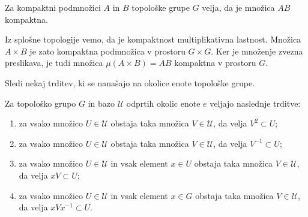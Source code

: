 \documentclass[mat1]{fmfdelo}
\newcommand{\Ucurl}{\mathcal{U}}
\begin{document}
\begin{trditev}\label{trd:prodkomp}
Za kompaktni podmnožici $A$ in $B$ topološke grupe $G$ velja, da je množica $AB$ kompaktna.
\end{trditev}

\begin{dokaz}
Iz splošne topologije vemo, da je kompaktnost multiplikativna lastnost. Množica $A \times B$ je zato kompaktna podmnožica v prostoru $G \times G$. Ker je množenje zvezna preslikava, je tudi množica $\mu (A \times B) = AB$ kompaktna v prostoru $G$.
\end{dokaz}

Sledi nekaj trditev, ki se nanašajo na okolice enote topološke grupe.

\begin{trditev}\label{trd:okolice}
Za topološko grupo $G$ in bazo $\Ucurl$ odprtih okolic enote $e$ veljajo naslednje trditve:
\begin{enumerate}
\item za vsako množico $U \in \Ucurl$ obstaja taka množica $V \in \Ucurl$, da velja $V^{2} \subset U$;\label{last:oko1}
\item za vsako množico $U \in \Ucurl$ obstaja taka množica $V \in \Ucurl$, da velja $V^{-1} \subset U$;\label{last:oko2}
\item za vsako množico $U \in \Ucurl$ in vsak element $x \in U$ obstaja taka množica $V \in \Ucurl$, da velja $xV \subset U$; \label{last:oko3}
\item za vsako množico $U \in \Ucurl$ in vsak element $x \in G$ obstaja taka množica $V \in \Ucurl$, da velja $xVx^{-1} \subset U$.\label{last:oko4}
\end{enumerate}
\end{trditev}
\end{document}

